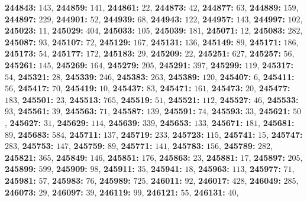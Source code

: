 \textsf{\bfseries 244843:} $143$, \textsf{\bfseries 244859:} $141$, \textsf{\bfseries 244861:} $22$, \textsf{\bfseries 244873:} $42$, \textsf{\bfseries 244877:} $63$, \textsf{\bfseries 244889:} $159$, \textsf{\bfseries 244897:} $229$, \textsf{\bfseries 244901:} $52$, \textsf{\bfseries 244939:} $68$, \textsf{\bfseries 244943:} $122$, \textsf{\bfseries 244957:} $143$, \textsf{\bfseries 244997:} $102$, \textsf{\bfseries 245023:} $11$, \textsf{\bfseries 245029:} $404$, \textsf{\bfseries 245033:} $105$, \textsf{\bfseries 245039:} $181$, \textsf{\bfseries 245071:} $12$, \textsf{\bfseries 245083:} $282$, \textsf{\bfseries 245087:} $93$, \textsf{\bfseries 245107:} $72$, \textsf{\bfseries 245129:} $167$, \textsf{\bfseries 245131:} $136$, \textsf{\bfseries 245149:} $89$, \textsf{\bfseries 245171:} $186$, \textsf{\bfseries 245173:} $54$, \textsf{\bfseries 245177:} $172$, \textsf{\bfseries 245183:} $29$, \textsf{\bfseries 245209:} $22$, \textsf{\bfseries 245251:} $627$, \textsf{\bfseries 245257:} $56$, \textsf{\bfseries 245261:} $145$, \textsf{\bfseries 245269:} $164$, \textsf{\bfseries 245279:} $205$, \textsf{\bfseries 245291:} $397$, \textsf{\bfseries 245299:} $119$, \textsf{\bfseries 245317:} $54$, \textsf{\bfseries 245321:} $28$, \textsf{\bfseries 245339:} $246$, \textsf{\bfseries 245383:} $263$, \textsf{\bfseries 245389:} $120$, \textsf{\bfseries 245407:} $6$, \textsf{\bfseries 245411:} $56$, \textsf{\bfseries 245417:} $70$, \textsf{\bfseries 245419:} $10$, \textsf{\bfseries 245437:} $83$, \textsf{\bfseries 245471:} $161$, \textsf{\bfseries 245473:} $20$, \textsf{\bfseries 245477:} $183$, \textsf{\bfseries 245501:} $23$, \textsf{\bfseries 245513:} $765$, \textsf{\bfseries 245519:} $51$, \textsf{\bfseries 245521:} $112$, \textsf{\bfseries 245527:} $46$, \textsf{\bfseries 245533:} $93$, \textsf{\bfseries 245561:} $39$, \textsf{\bfseries 245563:} $71$, \textsf{\bfseries 245587:} $139$, \textsf{\bfseries 245591:} $74$, \textsf{\bfseries 245593:} $33$, \textsf{\bfseries 245621:} $50$, \textsf{\bfseries 245627:} $31$, \textsf{\bfseries 245629:} $114$, \textsf{\bfseries 245639:} $339$, \textsf{\bfseries 245653:} $133$, \textsf{\bfseries 245671:} $181$, \textsf{\bfseries 245681:} $89$, \textsf{\bfseries 245683:} $584$, \textsf{\bfseries 245711:} $137$, \textsf{\bfseries 245719:} $233$, \textsf{\bfseries 245723:} $115$, \textsf{\bfseries 245741:} $15$, \textsf{\bfseries 245747:} $283$, \textsf{\bfseries 245753:} $147$, \textsf{\bfseries 245759:} $89$, \textsf{\bfseries 245771:} $141$, \textsf{\bfseries 245783:} $156$, \textsf{\bfseries 245789:} $282$, \textsf{\bfseries 245821:} $365$, \textsf{\bfseries 245849:} $146$, \textsf{\bfseries 245851:} $176$, \textsf{\bfseries 245863:} $23$, \textsf{\bfseries 245881:} $17$, \textsf{\bfseries 245897:} $205$, \textsf{\bfseries 245899:} $599$, \textsf{\bfseries 245909:} $98$, \textsf{\bfseries 245911:} $35$, \textsf{\bfseries 245941:} $18$, \textsf{\bfseries 245963:} $113$, \textsf{\bfseries 245977:} $71$, \textsf{\bfseries 245981:} $57$, \textsf{\bfseries 245983:} $76$, \textsf{\bfseries 245989:} $725$, \textsf{\bfseries 246011:} $92$, \textsf{\bfseries 246017:} $428$, \textsf{\bfseries 246049:} $285$, \textsf{\bfseries 246073:} $29$, \textsf{\bfseries 246097:} $39$, \textsf{\bfseries 246119:} $99$, \textsf{\bfseries 246121:} $55$, \textsf{\bfseries 246131:} $40$, 
